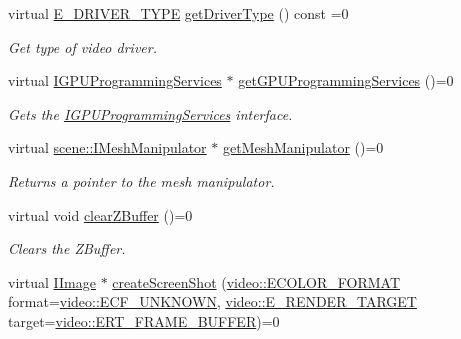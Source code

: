 \begin{DoxyCompactItemize}
virtual \hyperlink{namespaceirr_1_1video_ae35a6de6d436c76107ad157fe42356d0}{E\+\_\+\+D\+R\+I\+V\+E\+R\+\_\+\+T\+Y\+PE} \hyperlink{classirr_1_1video_1_1IVideoDriver_af89a0c4fcc0337f3befe8b90424e68aa}{get\+Driver\+Type} () const =0
\begin{DoxyCompactList}\small\item\em Get type of video driver. \end{DoxyCompactList}\item 
virtual \hyperlink{classirr_1_1video_1_1IGPUProgrammingServices}{I\+G\+P\+U\+Programming\+Services} $\ast$ \hyperlink{classirr_1_1video_1_1IVideoDriver_ad2098a408bbe9dad8053c3f4aea7d856}{get\+G\+P\+U\+Programming\+Services} ()=0
\begin{DoxyCompactList}\small\item\em Gets the \hyperlink{classirr_1_1video_1_1IGPUProgrammingServices}{I\+G\+P\+U\+Programming\+Services} interface. \end{DoxyCompactList}\item 
\mbox{\label{classirr_1_1video_1_1IVideoDriver_a9b76ea8ba013885c0f3d5f00131431ec}} 
virtual \hyperlink{classirr_1_1scene_1_1IMeshManipulator}{scene\+::\+I\+Mesh\+Manipulator} $\ast$ \hyperlink{classirr_1_1video_1_1IVideoDriver_a9b76ea8ba013885c0f3d5f00131431ec}{get\+Mesh\+Manipulator} ()=0
\begin{DoxyCompactList}\small\item\em Returns a pointer to the mesh manipulator. \end{DoxyCompactList}\item 
virtual void \hyperlink{classirr_1_1video_1_1IVideoDriver_a2036fe0a27dbd1a123ff5aedb07373a5}{clear\+Z\+Buffer} ()=0
\begin{DoxyCompactList}\small\item\em Clears the Z\+Buffer. \end{DoxyCompactList}\item 
virtual \hyperlink{classirr_1_1video_1_1IImage}{I\+Image} $\ast$ \hyperlink{classirr_1_1video_1_1IVideoDriver_a50db0e36d406089167facf70b2eb4706}{create\+Screen\+Shot} (\hyperlink{namespaceirr_1_1video_a1d5e487888c32b1674a8f75116d829ed}{video\+::\+E\+C\+O\+L\+O\+R\+\_\+\+F\+O\+R\+M\+AT} format=\hyperlink{namespaceirr_1_1video_a1d5e487888c32b1674a8f75116d829eda209608685f06c86c6ae489896a246e77}{video\+::\+E\+C\+F\+\_\+\+U\+N\+K\+N\+O\+WN}, \hyperlink{namespaceirr_1_1video_a5b61a3f2bd5d458f76f2eb20b0f40972}{video\+::\+E\+\_\+\+R\+E\+N\+D\+E\+R\+\_\+\+T\+A\+R\+G\+ET} target=\hyperlink{namespaceirr_1_1video_a5b61a3f2bd5d458f76f2eb20b0f40972a5745c3dbb79f4796906d8b15c42496b0}{video\+::\+E\+R\+T\+\_\+\+F\+R\+A\+M\+E\+\_\+\+B\+U\+F\+F\+ER})=0

\end{DoxyCompactItemize}
